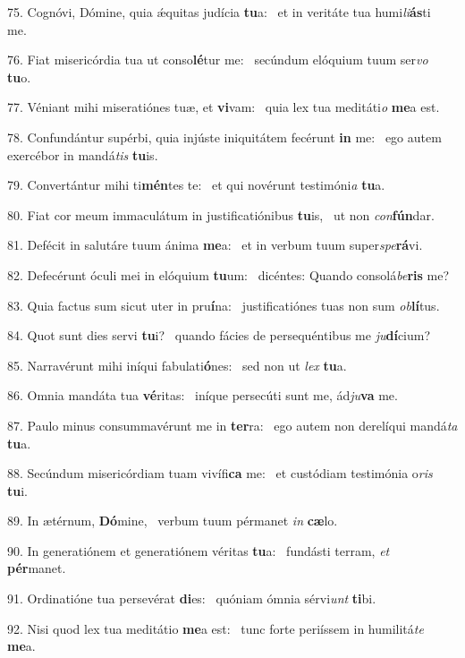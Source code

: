 75. Cognóvi, Dómine, quia ǽquitas judícia \textbf{tu}a: \ast\  et in veritáte tua humi\textit{li}\textbf{ás}ti me.\

76. Fiat misericórdia tua ut conso\textbf{lé}tur me: \ast\  secúndum elóquium tuum ser\textit{vo} \textbf{tu}o.\

77. Véniant mihi miseratiónes tuæ, et \textbf{vi}vam: \ast\  quia lex tua meditáti\textit{o} \textbf{me}a est.\

78. Confundántur supérbi, quia injúste iniquitátem fecérunt \textbf{in} me: \ast\  ego autem exercébor in mandá\textit{tis} \textbf{tu}is.\

79. Convertántur mihi ti\textbf{mén}tes te: \ast\  et qui novérunt testimóni\textit{a} \textbf{tu}a.\

80. Fiat cor meum immaculátum in justificatiónibus \textbf{tu}is, \ast\  ut non \textit{con}\textbf{fún}dar.\

81. Defécit in salutáre tuum ánima \textbf{me}a: \ast\  et in verbum tuum super\textit{spe}\textbf{rá}vi.\

82. Defecérunt óculi mei in elóquium \textbf{tu}um: \ast\  dicéntes: Quando consolá\textit{be}\textbf{ris} me?\

83. Quia factus sum sicut uter in pru\textbf{í}na: \ast\  justificatiónes tuas non sum \textit{ob}\textbf{lí}tus.\

84. Quot sunt dies servi \textbf{tu}i? \ast\  quando fácies de persequéntibus me \textit{ju}\textbf{dí}cium?\

85. Narravérunt mihi iníqui fabulati\textbf{ó}nes: \ast\  sed non ut \textit{lex} \textbf{tu}a.\

86. Omnia mandáta tua \textbf{vé}ritas: \ast\  iníque persecúti sunt me, ád\textit{ju}\textbf{va} me.\

87. Paulo minus consummavérunt me in \textbf{ter}ra: \ast\  ego autem non derelíqui mandá\textit{ta} \textbf{tu}a.\

88. Secúndum misericórdiam tuam vivífi\textbf{ca} me: \ast\  et custódiam testimónia o\textit{ris} \textbf{tu}i.\

89. In ætérnum, \textbf{Dó}mine, \ast\  verbum tuum pérmanet \textit{in} \textbf{cæ}lo.\

90. In generatiónem et generatiónem véritas \textbf{tu}a: \ast\  fundásti terram, \textit{et} \textbf{pér}manet.\

91. Ordinatióne tua persevérat \textbf{di}es: \ast\  quóniam ómnia sérvi\textit{unt} \textbf{ti}bi.\

92. Nisi quod lex tua meditátio \textbf{me}a est: \ast\  tunc forte periíssem in humilitá\textit{te} \textbf{me}a.\

